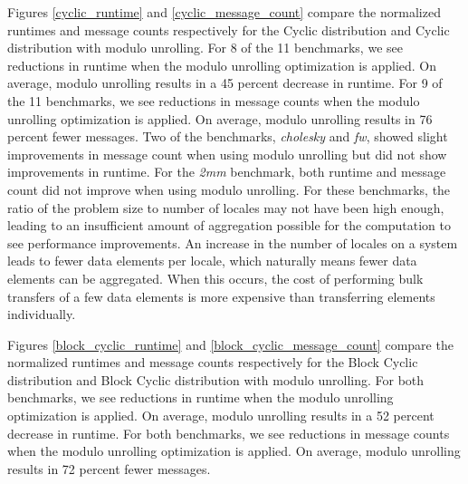 Figures \ref{cyclic_runtime} and \ref{cyclic_message_count} compare the normalized runtimes and message counts respectively for the Cyclic distribution and Cyclic distribution with modulo unrolling. For 8 of the 11 benchmarks, we see reductions in runtime when the modulo unrolling optimization is applied. On average, modulo unrolling results in a 45 percent decrease in runtime. For 9 of the 11 benchmarks, we see reductions in message counts when the modulo unrolling optimization is applied. On average, modulo unrolling results in 76 percent fewer messages. Two of the benchmarks, \textit{cholesky} and \textit{fw}, showed slight improvements in message count when using modulo unrolling but did not show improvements in runtime. For the \textit{2mm} benchmark, both runtime and message count did not improve when using modulo unrolling. For these benchmarks, the ratio of the problem size to number of locales may not have been high enough, leading to an insufficient amount of aggregation possible for the computation to see performance improvements. An increase in the number of locales on a system leads to fewer data elements per locale, which naturally means fewer data elements can be aggregated. When this occurs, the cost of performing bulk transfers of a few data elements is more expensive than transferring elements individually. 

Figures \ref{block_cyclic_runtime} and \ref{block_cyclic_message_count} compare the normalized runtimes and message counts respectively for the Block Cyclic distribution and Block Cyclic distribution with modulo unrolling. For both benchmarks, we see reductions in runtime when the modulo unrolling optimization is applied. On average, modulo unrolling results in a 52 percent decrease in runtime. For both benchmarks, we see reductions in message counts when the modulo unrolling optimization is applied. On average, modulo unrolling results in 72 percent fewer messages. 


